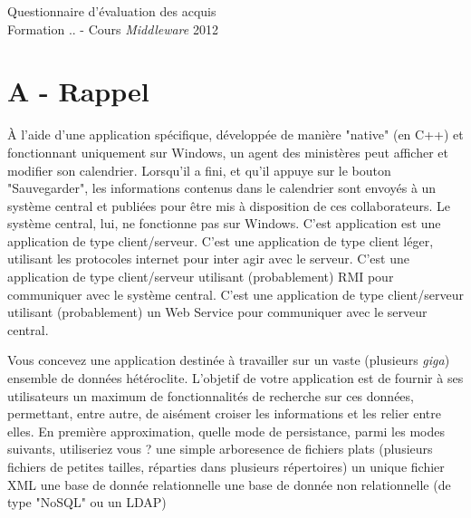 \documentclass[a4paper,10pt]{article}
\begin{document}
\begin{center}
  \begin{Large}
    Questionnaire d'évaluation des acquis\\
    Formation .. - Cours \textit{Middleware} 2012
  \end{Large}
\end{center}

\section{A - Rappel}

\begin{question}{À l'aide d'une application spécifique, développée de manière "native" (en C++)
et fonctionnant uniquement sur Windows, un agent des ministères peut afficher et modifier son
calendrier. Lorsqu'il a fini, et qu'il appuye sur le bouton "Sauvegarder", les informations contenus
dans le calendrier sont envoyés à un système central et publiées pour être mis à disposition de ces
collaborateurs. Le système central, lui, ne fonctionne pas sur Windows.}
  \true C'est application est une application de type client/serveur.
  \false C'est une application de type client léger, utilisant les protocoles internet pour inter
  agir avec le serveur.
  \false C'est une application de type client/serveur utilisant (probablement) RMI pour communiquer
  avec le système central.
  \false C'est une application de type client/serveur utilisant (probablement) un Web Service pour
  communiquer avec le serveur central.
\end{question}

\begin{question}{Vous concevez une application destinée à travailler sur un vaste (plusieurs
\textit{giga}) ensemble de données hétéroclite. L'objetif de votre application est de fournir à ses
utilisateurs un maximum de fonctionnalités de recherche sur ces données, permettant, entre autre, de
aisément croiser les informations et les relier entre elles. En première approximation, quelle mode
de persistance, parmi les modes suivants, utiliseriez vous ?}
  \false une simple arboresence de fichiers plats (plusieurs fichiers de petites tailles, réparties
  dans plusieurs répertoires)
  \false un unique fichier XML
  \true une base de donnée relationnelle
  \true une base de donnée non relationnelle (de type "NoSQL" ou un LDAP)
\end{question}
\end{document}
